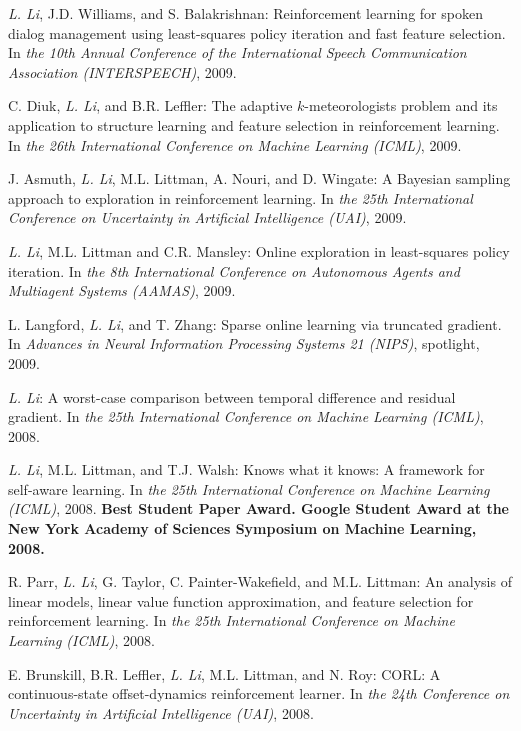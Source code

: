 \documentclass[10pt,twoside,letterpaper]{article}
\newcommand{\selffont}[1]{{\textit{#1}}}
\newcommand{\venuefont}[1]{{\textit{#1}}}
\newcommand{\myself}{\selffont{L. Li}}
\begin{document}
\begin{compactenum}[(C1)]
\item{\myself, J.D. Williams, and S. Balakrishnan: Reinforcement learning for spoken dialog management using least-squares policy iteration and fast feature selection. In \venuefont{the 10th Annual Conference of the International Speech Communication Association (INTERSPEECH)}, 2009.}

\item{C. Diuk, \myself, and B.R. Leffler: The adaptive $k$-meteorologists problem and its application to structure learning and feature selection in reinforcement learning. In \venuefont{the 26th International Conference on Machine Learning (ICML)}, 2009.}

\item{J. Asmuth, \myself, M.L. Littman, A. Nouri, and D. Wingate: A Bayesian sampling approach to exploration in reinforcement learning.  In \venuefont{the 25th International Conference on Uncertainty in Artificial Intelligence (UAI)}, 2009.}

\item{\myself, M.L. Littman and C.R. Mansley: Online exploration in least-squares policy iteration. In \venuefont{the 8th International Conference on Autonomous Agents and Multiagent Systems (AAMAS)}, 2009}.

\item{L. Langford, \myself, and T. Zhang: Sparse online learning via truncated gradient.  In \venuefont{Advances in Neural Information Processing Systems 21 (NIPS)}, spotlight, 2009.}

\item{\myself: A worst-case comparison between temporal difference and residual gradient.  In \venuefont{the 25th International Conference on Machine Learning (ICML)}, 2008.}

\item{\myself, M.L. Littman, and T.J. Walsh: Knows what it knows: A framework for self-aware learning. In \venuefont{the 25th International Conference on Machine Learning (ICML)}, 2008.  \textbf{Best Student Paper Award.  Google Student Award at the New York Academy of Sciences Symposium on Machine Learning, 2008.}}

\item{R. Parr, \myself, G. Taylor, C. Painter-Wakefield, and M.L. Littman: An analysis of linear models, linear value function approximation, and feature selection for reinforcement learning. In \venuefont{the 25th International Conference on Machine Learning (ICML)}, 2008.}

\item{E. Brunskill, B.R. Leffler, \myself, M.L. Littman, and N. Roy: CORL: A continuous-state offset-dynamics reinforcement learner.  In \venuefont{the 24th Conference on Uncertainty in Artificial Intelligence (UAI)}, 2008.}


\end{compactenum}
\end{document}
